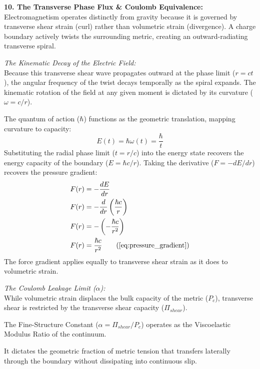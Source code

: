 \textbf{10. The Transverse Phase Flux \& Coulomb Equivalence:} \\
Electromagnetism operates distinctly from gravity because it is governed by transverse shear strain (curl) rather than volumetric strain (divergence). A charge boundary actively twists the surrounding metric, creating an outward-radiating transverse spiral. 

\vspace{0.2 cm}
\textit{The Kinematic Decay of the Electric Field:} \\
Because this transverse shear wave propagates outward at the phase limit ($r = c t$), the angular frequency of the twist decays temporally as the spiral expands. The kinematic rotation of the field at any given moment is dictated by its curvature ($\omega = c/r$).

The quantum of action ($\hbar$) functions as the geometric translation, mapping curvature to capacity:
\begin{equation}
    E(t) = \hbar \omega(t) = \frac{\hbar}{t}
\end{equation}
Substituting the radial phase limit ($t = r/c$) into the energy state recovers the energy capacity of the boundary ($E = \hbar c / r$). Taking the derivative ($F = -dE/dr$) recovers the pressure gradient:
\begin{align}
    F(r) &= - \frac{dE}{dr} \nonumber \\
    F(r) &= - \frac{d}{dr} \left( \frac{\hbar c}{r} \right) \nonumber \\
    F(r) &= - \left( - \frac{\hbar c}{r^2} \right) \nonumber \\
    F(r) &= \frac{\hbar c}{r^2} \tag{\ref{eq:pressure_gradient}}
\end{align}
The force gradient applies equally to transverse shear strain as it does to volumetric strain.

\vspace{0.2 cm}
\textit{The Coulomb Leakage Limit ($\alpha$):} \\
While volumetric strain displaces the bulk capacity of the metric ($P_c$), transverse shear is restricted by the transverse shear capacity ($\Pi_{shear}$). 

The Fine-Structure Constant ($\alpha = \Pi_{shear}/P_c$) operates as the Viscoelastic Modulus Ratio of the continuum. 

It dictates the geometric fraction of metric tension that transfers laterally through the boundary without dissipating into continuous slip. 

